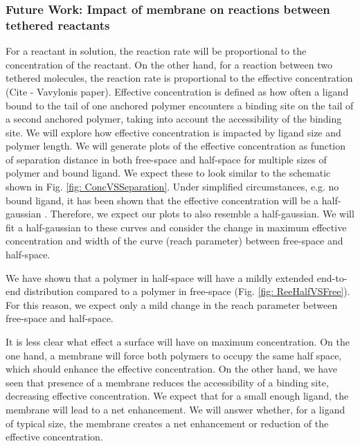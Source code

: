 \documentclass[../../AdvancementSummary.tex]{subfiles}
\begin{document}
\subsubsection{Future Work: Impact of membrane on reactions between tethered reactants}

For a reactant in solution, the reaction rate will be proportional to the concentration of the reactant. On the other hand, for a reaction between two tethered molecules, the reaction rate is proportional to the effective concentration \cite{VanValen2009, Bryant2017} (Cite - Vavylonis paper).
Effective concentration is defined as how often a ligand bound to the tail of one anchored polymer encounters a binding site on the tail of a second anchored polymer, taking into account the accessibility of the binding site. 
We will explore how effective concentration is impacted by ligand size and polymer length. We will generate plots of the effective concentration as function of separation distance in both free-space and half-space for multiple sizes of polymer and bound ligand. We expect these to look similar to the schematic shown in Fig. \ref{fig: ConcVSSeparation}. Under simplified circumstances, e.g. no bound ligand, it has been shown that the effective concentration will be a half-gaussian \cite{Goyette2017}. Therefore, we expect our plots to also resemble a half-gaussian. We will fit a half-gaussian to these curves and consider the change in maximum effective concentration and width of the curve (reach parameter) between free-space and half-space. 

We have shown that a polymer in half-space will have a mildly extended end-to-end distribution compared to a polymer in free-space (Fig. \ref{fig: ReeHalfVSFree}). For this reason, we expect only a mild change in the reach parameter between free-space and half-space. 

It is less clear what effect a surface will have on maximum concentration. 
	On the one hand, a membrane will force both polymers to occupy the same half space, which should enhance the effective concentration.
	On the other hand, we have seen that presence of a membrane reduces the accessibility of a binding site, decreasing effective concentration. 
	We expect that for a small enough ligand, the membrane will lead to a net enhancement. We will answer whether, for a ligand of typical size, the membrane creates a net enhancement or reduction of the effective concentration.
\end{document}
